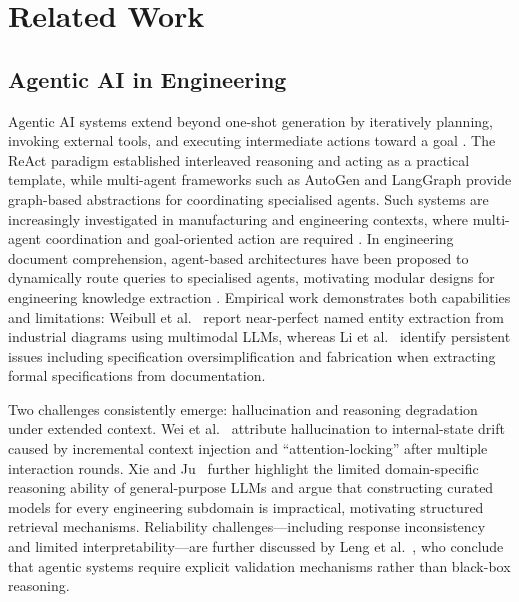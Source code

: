 \documentclass[largeformat]{interact}
\begin{document}
\section{Related Work}
\label{sec:related_work}
\subsection{Agentic AI in Engineering} 
\label{sec:agentic-ai-engineering} %
Agentic AI systems extend beyond one-shot generation by iteratively planning, invoking external tools, and executing intermediate actions toward a goal \cite{wang2024autonomousagents, prasad2024adapt}. The ReAct paradigm \cite{yao2023reactsynergizingreasoningacting} established interleaved reasoning and acting as a practical template, while multi-agent frameworks such as AutoGen \cite{wu2024autogen} and LangGraph provide graph-based abstractions for coordinating specialised agents. Such systems are increasingly investigated in manufacturing and engineering contexts, where multi-agent coordination and goal-oriented action are required \cite{leng2026, zhao2025}. In engineering document comprehension, agent-based architectures have been proposed to dynamically route queries to specialised agents, motivating modular designs for engineering knowledge extraction \cite{xie2026agentframework}. Empirical work demonstrates both capabilities and limitations: Weibull et al.~\cite{weibull_named_2025} report near-perfect named entity extraction from industrial diagrams using multimodal LLMs, whereas Li et al.~\cite{li2025a} identify persistent issues including specification oversimplification and fabrication when extracting formal specifications from documentation.
 
Two challenges consistently emerge: hallucination and reasoning degradation under extended context. Wei et al.~\cite{wei2026shadows} attribute hallucination to internal-state drift caused by incremental context injection and ``attention-locking'' after multiple interaction rounds. Xie and Ju~\cite{xie2026agentframework} further highlight the limited domain-specific reasoning ability of general-purpose LLMs and argue that constructing curated models for every engineering subdomain is impractical, motivating structured retrieval mechanisms. Reliability challenges---including response inconsistency and limited interpretability---are further discussed by Leng et al.~\cite{leng2026}, who conclude that agentic systems require explicit validation mechanisms rather than black-box reasoning.
\end{document}
